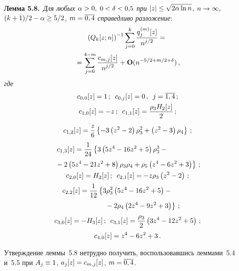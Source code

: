 \begin{multicols}{2}
 \smallskip

\noindent
\textbf{Лемма 5.8.}\
\textit{Для любых $\alpha\hm>0,$ $0\hm<\delta\hm<0{,}5$
 при $|z|\hm\le \sqrt{2\alpha\ln n}$, $n\hm\to \infty,$
 $(k+1)/2\hm-\alpha\hm\geq 5/2$, $m\hm=\overline{0,4}$ справедливо разложение}:
 \begin{multline*}
 \left(Q_k[z;n]\right)^{-1}\sum\limits_{j=0}^k \displaystyle\frac{\displaystyle q_j^{(m)}[z]\mathstrut}{\displaystyle n^{j/2}\mathstrut}={}\\
 {}=
  \sum\limits_{j=0}^{4-m} \displaystyle\frac{\displaystyle c_{m,j}[z]\mathstrut}{\displaystyle n^{j/2}\mathstrut}+\mathbf{O}(n^{-5/2+m/2+\delta})\,,
 \end{multline*}
\textit{где}
 \begin{gather*}
  c_{0,0}[z]=1\,;\enskip c_{0,j}[z]=0\,,\enskip j=\overline{1,4}\,;
\\
 c_{1,0}[z]=-z\,;\enskip  c_{1,1}[z]=\fr{\rho_3 H_2[z]}{2}\,;\\
 c_{1,2}[z]=\fr{z}{6} \left\{-3\left(z^2-2\right)\rho_3^2+
 \left(z^2-3\right)\rho_4\right\}\,;
\\
 \hspace*{-15mm}c_{1,3}[z]=\fr{1}{24} \left\{3 \left(5z^4-16z^2+5\right) \rho_3^3-{}\right.\\
\left. {}-2
 \left(5z^4-21z^2+8\right) \rho_3 \rho_4+\rho_5\left(z^4-6z^2+3\right) \right\}\,;
\\
 c_{2,0}[z]=H_2[z]\,;\enskip  c_{2,1}[z]=-z\rho_3\left(z^2-2\right)\,;
\\
\hspace*{-10mm}c_{2,2}[z]=   \fr{1}{12} \left\{3\rho_3^2\left(5z^4-16z^2+5\right)-{}\right.\\
\left. \hspace*{15mm}{}-
  2\rho_4\left(2z^4-9z^2+3\right)\right\}\,;
\\
 c_{3,0}[z]=-H_3[z]\,;\enskip
 c_{3,1}[z]=\fr{\rho_3}{2}\left(3z^4-12z^2+5\right)\,;\\
 c_{4,0}[z]=z^4-6 z^2+3\,.
 \end{gather*}

 Утверждение леммы~5.8 нетрудно получить, воспользовавшись леммами~5.4 и~5.5 при
 $A_j\hm\equiv 1$, $a_j[z]\hm=c_{m,j}[z]$, $m\hm=\overline{0,4}$.

\smallskip


\end{multicols}
